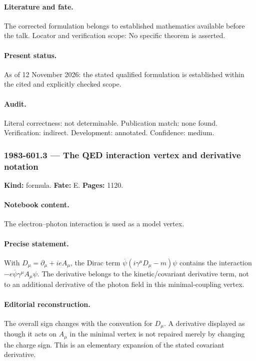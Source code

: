 \paragraph{Literature and fate.} The corrected formulation belongs to established mathematics available before the talk. Locator and verification scope: No specific theorem is asserted.

\paragraph{Present status.} As of 12 November 2026: the stated qualified formulation is established within the cited and explicitly checked scope.

\paragraph{Audit.} Literal correctness: not determinable. Publication match: none found. Verification: indirect. Development: annotated. Confidence: medium.

\subsubsection{1983-601.3 --- The QED interaction vertex and derivative notation}

\label{item:1983-601.3}

\noindent\textbf{Kind:} formula. \textbf{Fate:} E. \textbf{Pages:} 1120.\par

\paragraph{Notebook content.} The electron--photon interaction is used as a model vertex.

\paragraph{Precise statement.} With \(D_\mu=\partial_\mu+ieA_\mu\), the Dirac term \(\overline\psi(i\gamma^\mu D_\mu-m)\psi\) contains the interaction \(-e\overline\psi\gamma^\mu A_\mu\psi\). The derivative belongs to the kinetic/covariant derivative term, not to an additional derivative of the photon field in this minimal-coupling vertex.

\paragraph{Editorial reconstruction.} The overall sign changes with the convention for \(D_\mu\). A derivative displayed as though it acts on \(A_\mu\) in the minimal vertex is not repaired merely by changing the charge sign. This is an elementary expansion of the stated covariant derivative.

